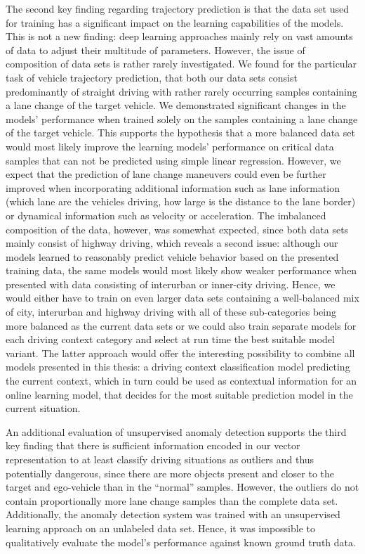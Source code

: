 The second key finding regarding trajectory prediction is that the data set used for training has a significant impact on the learning capabilities of the models.
This is not a new finding: deep learning approaches mainly rely on vast amounts of data to adjust their multitude of parameters.
However, the issue of composition of data sets is rather rarely investigated.
We found for the particular task of vehicle trajectory prediction, that both our data sets consist predominantly of straight driving with rather rarely occurring samples containing a lane change of the target vehicle.
We demonstrated significant changes in the models' performance when trained solely on the samples containing a lane change of the target vehicle.
This supports the hypothesis that a more balanced data set would most likely improve the learning models' performance on critical data samples that can not be predicted using simple linear regression.
However, we expect that the prediction of lane change maneuvers could even be further improved when incorporating additional information such as lane information (which lane are the vehicles driving, how large is the distance to the lane border) or dynamical information such as velocity or acceleration.
The imbalanced composition of the data, however, was somewhat expected, since both data sets mainly consist of highway driving, which reveals a second issue: although our models learned to reasonably predict vehicle behavior based on the presented training data, the same models would most likely show weaker performance when presented with data consisting of interurban or inner-city driving.
Hence, we would either have to train on even larger data sets containing a well-balanced mix of city, interurban and highway driving with all of these sub-categories being more balanced as the current data sets or we could also train separate models for each driving context category and select at run time the best suitable model variant.
The latter approach would offer the interesting possibility to combine all models presented in this thesis: a driving context classification model predicting the current context, which in turn could be used as contextual information for an online learning model, that decides for the most suitable prediction model in the current situation.

An additional evaluation of unsupervised anomaly detection supports the third key finding that there is sufficient information encoded in our vector representation to at least classify driving situations as outliers and thus potentially dangerous, since there are more objects present and closer to the target and ego-vehicle than in the \enquote{normal} samples.
However, the outliers do not contain proportionally more lane change samples than the complete data set.
Additionally, the anomaly detection system was trained with an unsupervised learning approach on an unlabeled data set.
Hence, it was impossible to qualitatively evaluate the model's performance against known ground truth data.

